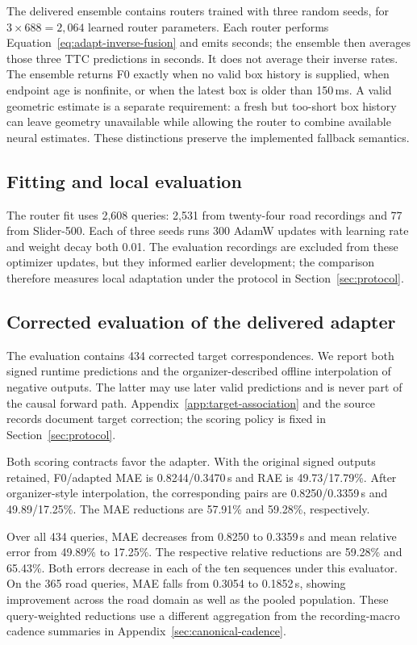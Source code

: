 The delivered ensemble contains routers trained with three random seeds, for $3\times688=2,064$ learned router parameters. Each router performs Equation~\ref{eq:adapt-inverse-fusion} and emits seconds; the ensemble then averages those three TTC predictions in seconds. It does not average their inverse rates. The ensemble returns F0 exactly when no valid box history is supplied, when endpoint age is nonfinite, or when the latest box is older than 150\,ms. A valid geometric estimate is a separate requirement: a fresh but too-short box history can leave geometry unavailable while allowing the router to combine available neural estimates. These distinctions preserve the implemented fallback semantics. 

\subsection{Fitting and local evaluation}
The router fit uses 2,608 queries: 2,531 from twenty-four road recordings and 77 from Slider-500. Each of three seeds runs 300 AdamW updates with learning rate and weight decay both 0.01. The evaluation recordings are excluded from these optimizer updates, but they informed earlier development; the comparison therefore measures local adaptation under the protocol in Section~\ref{sec:protocol}.

\subsection{Corrected evaluation of the delivered adapter}
\EvidenceAdaptTable
The evaluation contains 434 corrected target correspondences. We report both signed runtime predictions and the organizer-described offline interpolation of negative outputs. The latter may use later valid predictions and is never part of the causal forward path. Appendix~\ref{app:target-association} and the source records document target correction; the scoring policy is fixed in Section~\ref{sec:protocol}. 

Both scoring contracts favor the adapter. With the original signed outputs retained, F0/adapted MAE is 0.8244/0.3470\,s and RAE is 49.73/17.79\%. After organizer-style interpolation, the corresponding pairs are 0.8250/0.3359\,s and 49.89/17.25\%. The MAE reductions are 57.91\% and 59.28\%, respectively.  

Over all 434 queries, MAE decreases from 0.8250 to 0.3359\,s and mean relative error from 49.89\% to 17.25\%. The respective relative reductions are 59.28\% and 65.43\%. Both errors decrease in each of the ten sequences under this evaluator. On the 365 road queries, MAE falls from 0.3054 to 0.1852\,s, showing improvement across the road domain as well as the pooled population. These query-weighted reductions use a different aggregation from the recording-macro cadence summaries in Appendix~\ref{sec:canonical-cadence}.

